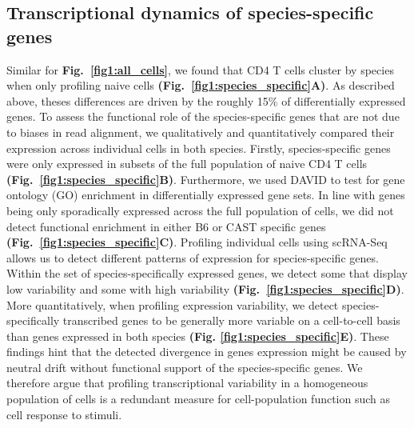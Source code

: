 \subsection{Transcriptional dynamics of species-specific genes}
\label{sec1:species-spec-dynamics}

Similar for \textbf{Fig.~\ref{fig1:all_cells}}, we found that CD4\plus{} T cells cluster by species when only profiling naive cells \textbf{(Fig.~\ref{fig1:species_specific}A)}. As described above, theses differences are driven by the roughly 15\% of differentially expressed genes. To assess the functional role of the species-specific genes that are not due to biases in read alignment, we qualitatively and quantitatively compared their expression across individual cells in both species. Firstly, species-specific genes were only expressed in subsets of the full population of naive CD4\plus{} T cells \textbf{(Fig.~\ref{fig1:species_specific}B)}. Furthermore, we used DAVID \citep{Dennis2003} to test for gene ontology (GO) enrichment in differentially expressed gene sets. In line with genes being only sporadically expressed across the full population of cells, we did not detect functional enrichment in either B6 or CAST specific genes \textbf{(Fig.~\ref{fig1:species_specific}C)}. Profiling individual cells using scRNA-Seq allows us to detect different patterns of expression for species-specific genes. Within the set of species-specifically expressed genes, we detect some that display low variability and some with high variability \textbf{(Fig.~\ref{fig1:species_specific}D)}. More quantitatively, when profiling expression variability, we detect species-specifically transcribed genes to be generally more variable on a cell-to-cell basis than genes expressed in both species \textbf{(Fig. \ref{fig1:species_specific}E)}. These findings hint that the detected divergence in genes expression might be caused by neutral drift without functional support of the species-specific genes. We therefore argue that profiling transcriptional variability in a homogeneous population of cells is a redundant measure for cell-population function such as cell response to stimuli.

\newpage

